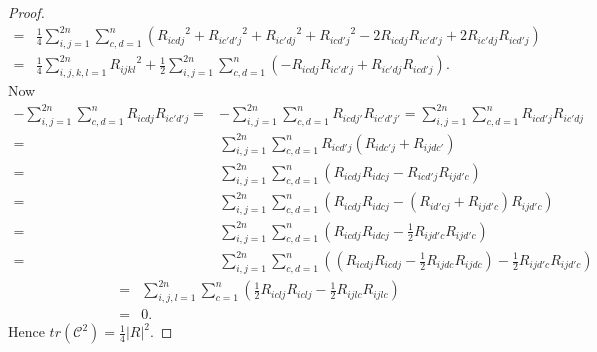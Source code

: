 \documentclass{amsart}
\theoremstyle{definition}
\theoremstyle{remark}
\numberwithin{equation}{section}
\begin{document}
\begin{proof}
\begin{align*}
   =& \frac{1}{4}\sum\limits_{i,j = 1}^{2n} {\sum\limits_{c,d = 1}^n {\left( {{R_{icdj}}^2 + {R_{ic'd'j}}^2 + {R_{ic'dj}}^2 + {R_{icd'j}}^2 - 2{R_{icdj}}{R_{ic'd'j}} + 2{R_{ic'dj}}{R_{icd'j}}} \right)} }   \\
   =& \frac{1}{4}\sum\limits_{i,j,k,l = 1}^{2n} {{R_{ijkl}}^2  } + \frac{1}{2} \sum\limits_{i,j = 1}^{2n} {\sum\limits_{c,d = 1}^n {\left( { - {R_{icdj}}{R_{ic'd'j}} + {R_{ic'dj}}{R_{icd'j}}} \right)} }.
\end{align*}
Now
\begin{align*}
   - \sum\limits_{i,j = 1}^{2n} {\sum\limits_{c,d = 1}^n {{R_{icdj}}{R_{ic'd'j}}} }  =&  - \sum\limits_{i,j = 1}^{2n} {\sum\limits_{c,d = 1}^n {{R_{icdj'}}{R_{ic'd'j'}}} }  = \sum\limits_{i,j = 1}^{2n} {\sum\limits_{c,d = 1}^n {{R_{icd'j}}{R_{ic'dj}}} }   \\
   =& \sum\limits_{i,j = 1}^{2n} {\sum\limits_{c,d = 1}^n {{R_{icd'j}}\left( {{R_{idc'j}} + {R_{ijdc'}}} \right)} }  \\
   =& \sum\limits_{i,j = 1}^{2n} {\sum\limits_{c,d = 1}^n {\left( {{R_{icdj}}{R_{idcj}} - {R_{icd'j}}{R_{ijd'c}}} \right)} }   \\
   =& \sum\limits_{i,j = 1}^{2n} {\sum\limits_{c,d = 1}^n {\left( {{R_{icdj}}{R_{idcj}} - \left( {{R_{id'cj}} + {R_{ijd'c}}} \right){R_{ijd'c}}} \right)} }   \\
   =& \sum\limits_{i,j = 1}^{2n} {\sum\limits_{c,d = 1}^n {\left( {{R_{icdj}}{R_{idcj}} - \frac{1}{2}{R_{ijd'c}}{R_{ijd'c}}} \right)} }   \\
   =& \sum\limits_{i,j = 1}^{2n} {\sum\limits_{c,d = 1}^n {\left( {\left( {{R_{icdj}}{R_{icdj}} - \frac{1}{2}{R_{ijdc}}{R_{ijdc}}} \right) - \frac{1}{2}{R_{ijd'c}}{R_{ijd'c}}} \right)} }
   \end{align*}
   \begin{align*}
   =& \sum\limits_{i,j,l = 1}^{2n} {\sum\limits_{c = 1}^n {\left( {\frac{1}{2}{R_{iclj}}{R_{iclj}} - \frac{1}{2}{R_{ijlc}}{R_{ijlc}}} \right)} }  \\
   =& 0 .
\end{align*}
Hence
$tr\left( {{\mathcal{C}^2}} \right) = \frac{1}{4}{\left| R \right|^2}$.


\end{proof}
\end{document}
